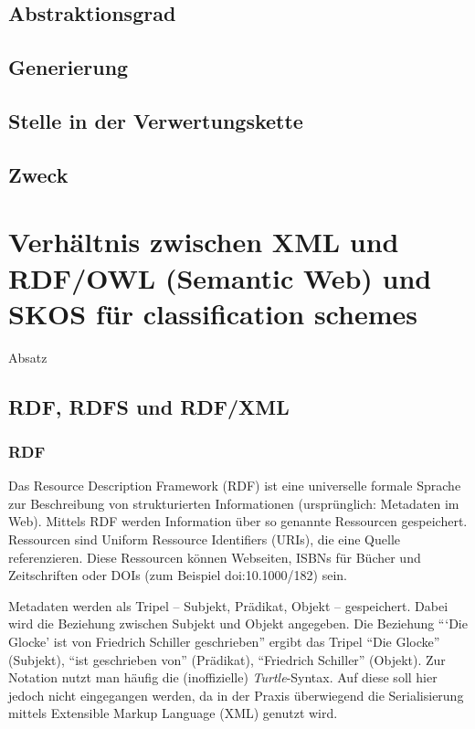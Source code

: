 	\subsection{Abstraktionsgrad}
	\subsection{Generierung}
	\subsection{Stelle in der Verwertungskette}
	\subsection{Zweck}
	
	\newpage
	\section{Verhältnis zwischen XML und RDF/OWL (Semantic Web) und SKOS für classification schemes}
	Absatz

	\subsection{RDF, RDFS und RDF/XML}
	\subsubsection{RDF}
	Das Resource Description Framework (RDF) ist eine universelle formale Sprache zur Beschreibung von strukturierten Informationen (ursprünglich: Metadaten im Web). Mittels RDF werden Information über so genannte Ressourcen gespeichert. Ressourcen sind Uniform Ressource Identifiers (URIs), die eine Quelle referenzieren. Diese Ressourcen können Webseiten, ISBNs für Bücher und Zeitschriften oder DOIs (zum Beispiel doi:10.1000/182) sein.
	
	Metadaten werden als Tripel -- Subjekt, Prädikat, Objekt -- gespeichert. Dabei wird die Beziehung zwischen Subjekt und Objekt angegeben. Die Beziehung \enquote{\enquote{Die Glocke} ist von Friedrich Schiller geschrieben} ergibt das Tripel \enquote{Die Glocke} (Subjekt), \enquote{ist geschrieben von} (Prädikat), \enquote{Friedrich Schiller} (Objekt). Zur Notation nutzt man häufig die (inoffizielle) \emph{Turtle}-Syntax. %
	Auf diese soll hier jedoch nicht eingegangen werden, da in der Praxis überwiegend die Serialisierung mittels Extensible Markup Language (XML) genutzt wird.
	
